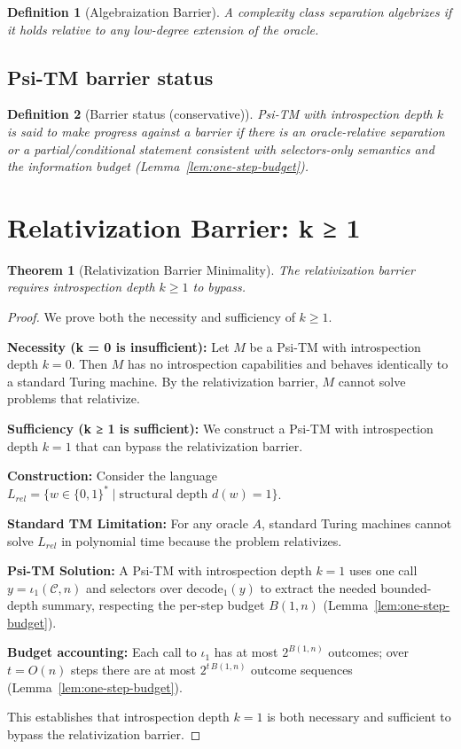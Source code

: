 \documentclass[11pt]{article}
\newtheorem{definition}{Definition}
\newtheorem{theorem}{Theorem}
\begin{document}
\begin{definition}[Algebraization Barrier]
A complexity class separation algebrizes if it holds relative to any low-degree extension of the oracle.
\end{definition}

\subsection{Psi-TM barrier status}

\begin{definition}[Barrier status (conservative)]
Psi-TM with introspection depth $k$ is said to make progress against a barrier if there is an oracle-relative separation or a partial/conditional statement consistent with selectors-only semantics and the information budget (Lemma~\ref{lem:one-step-budget}).
\end{definition}

\section{Relativization Barrier: k ≥ 1}

\begin{theorem}[Relativization Barrier Minimality]
The relativization barrier requires introspection depth $k \geq 1$ to bypass.
\end{theorem}

\begin{proof}
We prove both the necessity and sufficiency of $k \geq 1$.

\textbf{Necessity (k = 0 is insufficient):}
Let $M$ be a Psi-TM with introspection depth $k = 0$. Then $M$ has no introspection capabilities and behaves identically to a standard Turing machine. By the relativization barrier, $M$ cannot solve problems that relativize.

\textbf{Sufficiency (k ≥ 1 is sufficient):}
We construct a Psi-TM with introspection depth $k = 1$ that can bypass the relativization barrier.

\textbf{Construction:}
Consider the language $L_{rel} = \{w \in \{0,1\}^* \mid \text{structural depth } d(w) = 1\}$.

\textbf{Standard TM Limitation:}
For any oracle $A$, standard Turing machines cannot solve $L_{rel}$ in polynomial time because the problem relativizes.

\textbf{Psi-TM Solution:}
A Psi-TM with introspection depth $k = 1$ uses one call $y=\iota_1(\mathcal{C},n)$ and selectors over $\mathrm{decode}_1(y)$ to extract the needed bounded-depth summary, respecting the per-step budget $B(1,n)$ (Lemma~\ref{lem:one-step-budget}).

\textbf{Budget accounting:}
Each call to $\iota_1$ has at most $2^{B(1,n)}$ outcomes; over $t=O(n)$ steps there are at most $2^{t\,B(1,n)}$ outcome sequences (Lemma~\ref{lem:one-step-budget}).

This establishes that introspection depth $k = 1$ is both necessary and sufficient to bypass the relativization barrier.
\end{proof}
\end{document}
